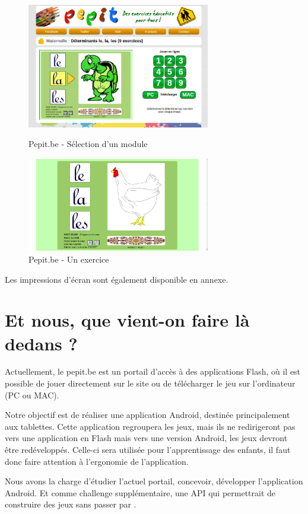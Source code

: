 \begin{figure}[H]
	\begin{minipage}[c]{.46\linewidth}
		\includegraphics[width=8cm]{images/pepit_be_modules}
		\caption{Pepit.be - Sélection d'un module}
		\label{Pepit.be - Sélection d'un module}
   	\end{minipage} \hfill
   	\begin{minipage}[c]{.46\linewidth}
      	\includegraphics[width=8cm]{images/pepit_be_practice}
		\caption{Pepit.be - Un exercice}
		\label{Pepit.be - Un exercice}
   	\end{minipage}
\end{figure}


Les impressions d'écran sont également disponible en annexe.

\section{Et nous, que vient-on faire là dedans ?}
Actuellement, le pepit.be est un portail d'accès à des applications Flash, où il est possible de jouer directement sur le site ou de télécharger le jeu sur l'ordinateur (PC ou MAC).


Notre objectif est de réaliser une application Android, destinée principalement aux tablettes. Cette application regroupera les jeux, mais ils ne redirigeront pas vers une application en Flash mais vers une version Android, les jeux devront être redéveloppés. Celle-ci sera utilisée pour l'apprentissage des enfants, il faut donc faire attention à l'ergonomie de l'application.


Nous avons la charge d'étudier l'actuel portail, concevoir, développer l'application Android. Et comme challenge supplémentaire, une API qui permettrait de construire des jeux sans passer par \java{}.
